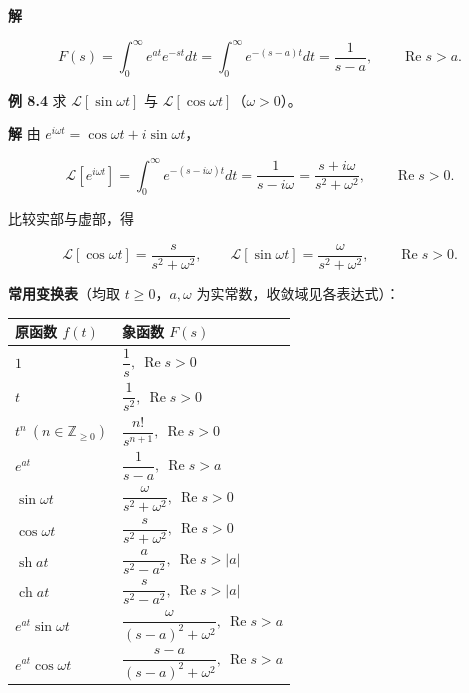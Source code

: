 \textbf{解}

\[
F(s)=\int_0^{\infty} e^{at}e^{-st}dt=\int_0^{\infty} e^{-(s-a)t}dt
=\frac{1}{s-a},\qquad \operatorname{Re}s>a .
\]

\textbf{例 8.4} 求 \(\mathcal{L}[\sin\omega t]\) 与
\(\mathcal{L}[\cos\omega t]\)（\(\omega>0\)）。

\textbf{解} 由 \(e^{i\omega t}=\cos\omega t+i\sin\omega t\)，

\[
\mathcal{L}[e^{i\omega t}]=\int_0^{\infty}e^{-(s-i\omega)t}dt
=\frac{1}{s-i\omega}
=\frac{s+i\omega}{s^2+\omega^2},\qquad \operatorname{Re}s>0 .
\]

比较实部与虚部，得

\[
\mathcal{L}[\cos\omega t]=\frac{s}{s^2+\omega^2},\qquad
\mathcal{L}[\sin\omega t]=\frac{\omega}{s^2+\omega^2},\qquad \operatorname{Re}s>0 .
\]

\textbf{常用变换表}（均取 \(t\ge 0\)，\(a,\omega\)
为实常数，收敛域见各表达式）：

{\def\LTcaptype{none} %
\begin{longtable}[]{@{}
  >{\raggedright\arraybackslash}p{}
  >{\raggedright\arraybackslash}p{}@{}}
\toprule\noalign{}
\begin{minipage}[b]{\linewidth}\raggedright
原函数 \(f(t)\)
\end{minipage} & \begin{minipage}[b]{\linewidth}\raggedright
象函数 \(F(s)\)
\end{minipage} \\
\midrule\noalign{}
\endhead
\bottomrule\noalign{}
\endlastfoot
\(1\) & \(\dfrac{1}{s},\ \operatorname{Re}s>0\) \\
\(t\) & \(\dfrac{1}{s^2},\ \operatorname{Re}s>0\) \\
\(t^n\ (n\in\mathbb{Z}_{\ge0})\) &
\(\dfrac{n!}{s^{n+1}},\ \operatorname{Re}s>0\) \\
\(e^{at}\) & \(\dfrac{1}{s-a},\ \operatorname{Re}s>a\) \\
\(\sin\omega t\) &
\(\dfrac{\omega}{s^2+\omega^2},\ \operatorname{Re}s>0\) \\
\(\cos\omega t\) & \(\dfrac{s}{s^2+\omega^2},\ \operatorname{Re}s>0\) \\
\(\operatorname{sh} at\) &
\(\dfrac{a}{s^2-a^2},\ \operatorname{Re}s>|a|\) \\
\(\operatorname{ch} at\) &
\(\dfrac{s}{s^2-a^2},\ \operatorname{Re}s>|a|\) \\
\(e^{at}\sin\omega t\) &
\(\dfrac{\omega}{(s-a)^2+\omega^2},\ \operatorname{Re}s>a\) \\
\(e^{at}\cos\omega t\) &
\(\dfrac{s-a}{(s-a)^2+\omega^2},\ \operatorname{Re}s>a\) \\
\end{longtable}
}

